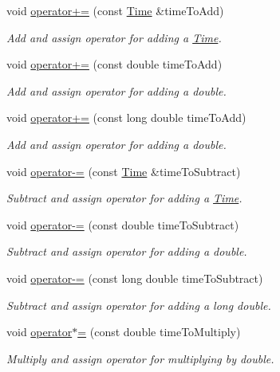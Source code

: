 \begin{DoxyCompactItemize}
void \hyperlink{classtudat_1_1Time_a9e1836bd588822d997e7c5cbfcc41ff9}{operator+=} (const \hyperlink{classtudat_1_1Time}{Time} \&time\+To\+Add)
\begin{DoxyCompactList}\small\item\em Add and assign operator for adding a \hyperlink{classtudat_1_1Time}{Time}. \end{DoxyCompactList}\item 
void \hyperlink{classtudat_1_1Time_a8569717b396abae3625c090aae733c7e}{operator+=} (const double time\+To\+Add)
\begin{DoxyCompactList}\small\item\em Add and assign operator for adding a double. \end{DoxyCompactList}\item 
void \hyperlink{classtudat_1_1Time_ade04ad9e012e3afafd5c00785590b047}{operator+=} (const long double time\+To\+Add)
\begin{DoxyCompactList}\small\item\em Add and assign operator for adding a double. \end{DoxyCompactList}\item 
void \hyperlink{classtudat_1_1Time_a54a080f4f4d563b402da7b4acf79615f}{operator-\/=} (const \hyperlink{classtudat_1_1Time}{Time} \&time\+To\+Subtract)
\begin{DoxyCompactList}\small\item\em Subtract and assign operator for adding a \hyperlink{classtudat_1_1Time}{Time}. \end{DoxyCompactList}\item 
void \hyperlink{classtudat_1_1Time_a9195c01eca670d09e96c1e3275edf253}{operator-\/=} (const double time\+To\+Subtract)
\begin{DoxyCompactList}\small\item\em Subtract and assign operator for adding a double. \end{DoxyCompactList}\item 
void \hyperlink{classtudat_1_1Time_a34d475b6c10c7f7700f03c6910806ba7}{operator-\/=} (const long double time\+To\+Subtract)
\begin{DoxyCompactList}\small\item\em Subtract and assign operator for adding a long double. \end{DoxyCompactList}\item 
void \hyperlink{classtudat_1_1Time_a290598017d980f65668ad7366fa7778b}{operator$\ast$=} (const double time\+To\+Multiply)
\begin{DoxyCompactList}\small\item\em Multiply and assign operator for multiplying by double. \end{DoxyCompactList}\item 

\end{DoxyCompactItemize}
